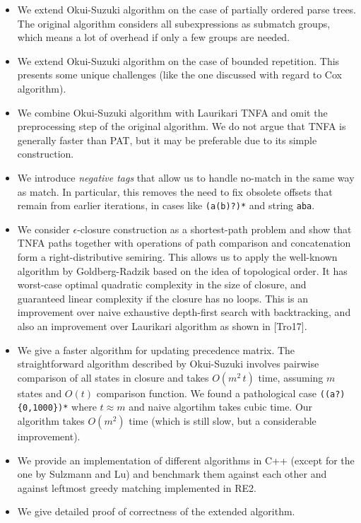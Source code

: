 \documentclass[AMA,STIX1COL]{WileyNJD-v2}
\begin{document}
\begin{itemize}[itemsep=0.5em]

    \item We extend Okui-Suzuki algorithm on the case of partially ordered parse trees.
        The original algorithm considers all subexpressions as submatch groups,
        which means a lot of overhead if only a few groups are needed.

    \item We extend Okui-Suzuki algorithm on the case of bounded repetition.
        This presents some unique challenges (like the one discussed with regard to Cox algorithm).

    \item We combine Okui-Suzuki algorithm with Laurikari TNFA
        and omit the preprocessing step of the original algorithm.
        We do not argue that TNFA is generally faster than PAT,
        but it may be preferable due to its simple construction.

    \item We introduce \emph{negative tags} that allow us to handle
        no-match in the same way as match.
        In particular, this removes the need to fix obsolete offsets that remain from earlier iterations,
        in cases like \texttt{(a(b)?)*} and string \texttt{aba}.

    \item We consider $\epsilon$-closure construction as a shortest-path problem
        and show that TNFA paths together with operations of path comparison and concatenation form a right-distributive semiring.
        This allows us to apply the well-known algorithm by Goldberg-Radzik based on the idea of topological order.
        It has worst-case optimal quadratic complexity in the size of closure,
        and guaranteed linear complexity if the closure has no loops.
        This is an improvement over naive exhaustive depth-first search with backtracking,
        and also an improvement over Laurikari algorithm as shown in [Tro17].

    \item We give a faster algorithm for updating precedence matrix.
        The straightforward algorithm described by Okui-Suzuki involves pairwise comparison of all states in closure
        and takes $O(m^2 \, t)$ time, assuming $m$ states and $O(t)$ comparison function.
        We found a pathological case \texttt{((a?)\{0,1000\})*} where $t \approx m$ and naive algortihm takes cubic time.
        Our algorithm takes $O(m^2)$ time (which is still slow, but a considerable improvement).

    \item We provide an implementation of different algorithms in C++ (except for the one by Sulzmann and Lu)
        and benchmark them against each other and against leftmost greedy matching implemented in RE2.

    \item We give detailed proof of correctness of the extended algorithm.
    \\
\end{itemize}
\end{document}
